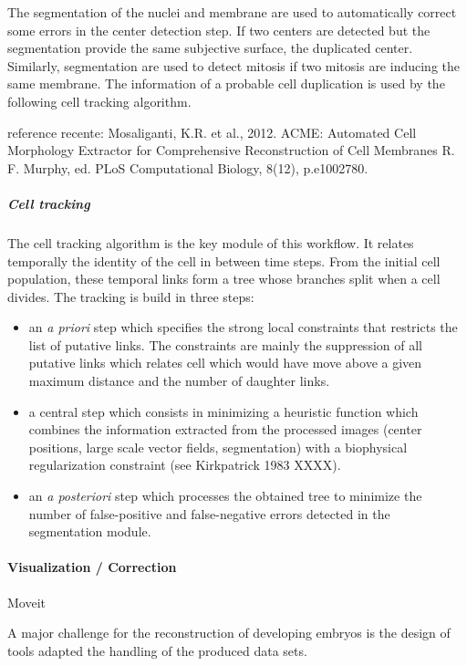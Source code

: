   The segmentation of the nuclei and membrane are used to automatically correct some errors in the center detection step. If two centers are detected but the segmentation provide the same subjective surface, the duplicated center. Similarly, segmentation are used to detect mitosis if two mitosis are inducing the same membrane. The information of a probable cell duplication is used by the following cell tracking algorithm. 

reference recente: Mosaliganti, K.R. et al., 2012. ACME: Automated Cell Morphology Extractor for Comprehensive Reconstruction of Cell Membranes R. F. Murphy, ed. PLoS Computational Biology, 8(12), p.e1002780. \cite{Mosaliganti:2012gj}

\subparagraph{Cell tracking}

  The cell tracking algorithm is the key module of this workflow. It relates temporally the identity of the cell in between time steps. From the initial cell population, these temporal links form a tree whose branches split when a cell divides. The tracking is build in three steps: 
\begin{itemize}
	\item an \textit{a priori} step which specifies the strong local constraints that restricts the list of putative links. The constraints are mainly the suppression of all putative links which relates cell which would have move above a given maximum distance and the number of daughter links.
	\item a central step which consists in minimizing a heuristic function which combines the information extracted from the processed images (center positions, large scale vector fields, segmentation) with a biophysical regularization constraint (see Kirkpatrick 1983 XXXX).
	\item an \textit{a posteriori} step which processes the obtained tree to minimize the number of false-positive and false-negative errors detected in the segmentation module.
\end{itemize}

\paragraph{Visualization / Correction}

  Moveit 

  A major challenge for the reconstruction of developing embryos is the design of tools adapted the handling of the produced data sets. 

